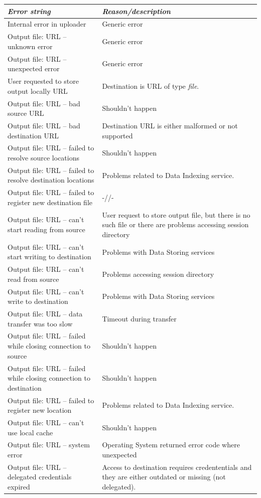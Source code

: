 \documentclass{article}                            %
\begin{document}
\begin{longtable}{|p{5cm}|p{10cm}|}
\hline 
\emph{Error string}&
\emph{Reason/description}\tabularnewline
\hline 
Internal error in uploader&
Generic error \tabularnewline
\hline 
Output file: URL -- unknown error&
Generic error \tabularnewline
\hline 
Output file: URL -- unexpected error&
Generic error \tabularnewline
\hline 
User requested to store output locally URL&
Destination is URL of type \emph{file}.\tabularnewline
\hline 
Output file: URL -- bad source URL&
Shouldn't happen\tabularnewline
\hline 
Output file: URL -- bad destination URL&
Destination URL is either malformed or not supported\tabularnewline
\hline 
Output file: URL -- failed to resolve source locations&
Shouldn't happen\tabularnewline
\hline 
Output file: URL -- failed to resolve destination locations&
Problems related to Data Indexing service.\tabularnewline
\hline 
Output file: URL -- failed to register new destination file&
-//-\tabularnewline
\hline 
Output file: URL -- can't start reading from source&
User request to store output file, but there is no such file or there
are problems accessing session directory\tabularnewline
\hline 
Output file: URL -- can't start writing to destination&
Problems with Data Storing services\tabularnewline
\hline 
Output file: URL -- can't read from source&
Problems accessing session directory\tabularnewline
\hline 
Output file: URL -- can't write to destination&
Problems with Data Storing services\tabularnewline
\hline 
Output file: URL -- data transfer was too slow&
Timeout during transfer\tabularnewline
\hline 
Output file: URL -- failed while closing connection to source&
Shouldn't happen\tabularnewline
\hline 
Output file: URL -- failed while closing connection to destination&
Shouldn't happen\tabularnewline
\hline 
Output file: URL -- failed to register new location&
Problems related to Data Indexing service.\tabularnewline
\hline 
Output file: URL -- can't use local cache&
Shouldn't happen\tabularnewline
\hline 
Output file: URL -- system error&
Operating System returned error code where unexpected\tabularnewline
\hline 
Output file: URL -- delegated credentials expired&
Access to destination requires credententials and they are either
outdated or missing (not delegated).\tabularnewline
\hline
\end{longtable}

\end{document}

